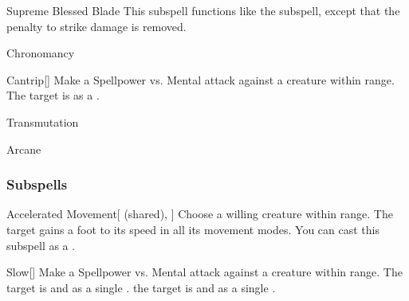\begin{ability}[\nth{9}]{Supreme Blessed Blade}
This subspell functions like the  subspell, except that the penalty to strike damage is removed.
\end{ability}
\vspace{0.25em}

\newpage
\begin{spellsection}{Chronomancy}

\begin{spellheader}
\end{spellheader}


\begin{ability}{Cantrip}[]
Make a Spellpower vs. Mental attack against a creature within \rngmed range.
\hit The target is  as a .
\end{ability}




 Transmutation

 Arcane
\end{spellsection}


\subsubsection{Subspells}


\begin{ability}[\nth{1}]{Accelerated Movement}[ (shared), ]
Choose a willing creature within \rngmed range.
The target gains a  foot  to its speed in all its movement modes.
You can cast this subspell as a .
\end{ability}
\vspace{0.25em}


\begin{ability}[\nth{1}]{Slow}[]
Make a Spellpower vs. Mental attack against a creature within \rngmed range.
\hit The target is  and  as a single .
\crit the target is  and  as a single .
\end{ability}
\vspace{0.25em}


